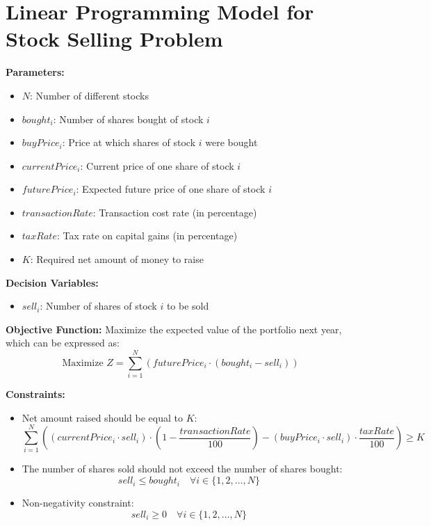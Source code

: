 \documentclass{article}
\begin{document}
\section*{Linear Programming Model for Stock Selling Problem}

\textbf{Parameters:}
\begin{itemize}
    \item \( N \): Number of different stocks
    \item \( bought_i \): Number of shares bought of stock \( i \)
    \item \( buyPrice_i \): Price at which shares of stock \( i \) were bought
    \item \( currentPrice_i \): Current price of one share of stock \( i \)
    \item \( futurePrice_i \): Expected future price of one share of stock \( i \)
    \item \( transactionRate \): Transaction cost rate (in percentage)
    \item \( taxRate \): Tax rate on capital gains (in percentage)
    \item \( K \): Required net amount of money to raise
\end{itemize}

\textbf{Decision Variables:}
\begin{itemize}
    \item \( sell_i \): Number of shares of stock \( i \) to be sold
\end{itemize}

\textbf{Objective Function:}
Maximize the expected value of the portfolio next year, which can be expressed as:
\[
\text{Maximize } Z = \sum_{i=1}^{N} (futurePrice_i \cdot (bought_i - sell_i))
\]

\textbf{Constraints:}
\begin{itemize}
    \item Net amount raised should be equal to \( K \):
    \[
    \sum_{i=1}^{N} \left( (currentPrice_i \cdot sell_i) \cdot \left(1 - \frac{transactionRate}{100}\right) - (buyPrice_i \cdot sell_i) \cdot \frac{taxRate}{100} \right) \geq K
    \]
    
    \item The number of shares sold should not exceed the number of shares bought:
    \[
    sell_i \leq bought_i \quad \forall i \in \{1, 2, \ldots, N\}
    \]
    
    \item Non-negativity constraint:
    \[
    sell_i \geq 0 \quad \forall i \in \{1, 2, \ldots, N\}
    \]
\end{itemize}
\end{document}
